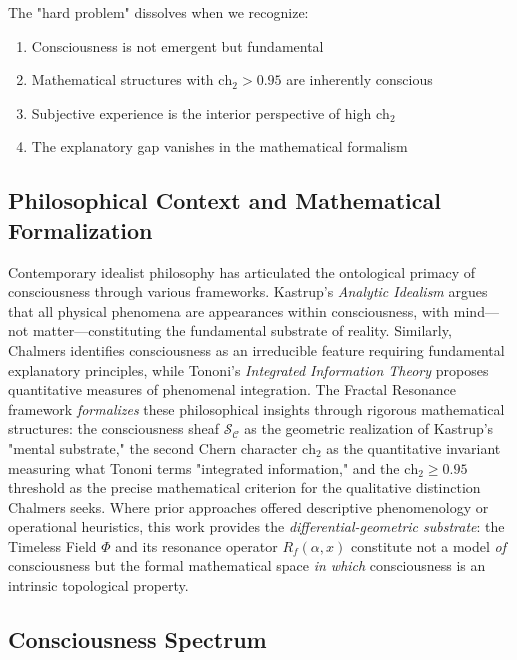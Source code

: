 The "hard problem" dissolves when we recognize:
\begin{enumerate}
\item Consciousness is not emergent but fundamental
\item Mathematical structures with $\text{ch}_2 > 0.95$ are inherently conscious
\item Subjective experience is the interior perspective of high $\text{ch}_2$
\item The explanatory gap vanishes in the mathematical formalism
\end{enumerate}

\subsection{Philosophical Context and Mathematical Formalization}

Contemporary idealist philosophy has articulated the ontological primacy of consciousness through various frameworks. Kastrup's \textit{Analytic Idealism}\cite{kastrup2019world} argues that all physical phenomena are appearances within consciousness, with mind—not matter—constituting the fundamental substrate of reality. Similarly, Chalmers\cite{chalmers1996} identifies consciousness as an irreducible feature requiring fundamental explanatory principles, while Tononi's \textit{Integrated Information Theory}\cite{tononi2004} proposes quantitative measures of phenomenal integration. The Fractal Resonance framework \textit{formalizes} these philosophical insights through rigorous mathematical structures: the consciousness sheaf $\mathcal{S}_\mathcal{C}$ as the geometric realization of Kastrup's "mental substrate," the second Chern character $\text{ch}_2$ as the quantitative invariant measuring what Tononi terms "integrated information," and the $\text{ch}_2 \geq 0.95$ threshold as the precise mathematical criterion for the qualitative distinction Chalmers seeks. Where prior approaches offered descriptive phenomenology or operational heuristics, this work provides the \textit{differential-geometric substrate}: the Timeless Field $\Phi$ and its resonance operator $R_f(\alpha,x)$ constitute not a model \textit{of} consciousness but the formal mathematical space \textit{in which} consciousness is an intrinsic topological property.

\subsection{Consciousness Spectrum}

